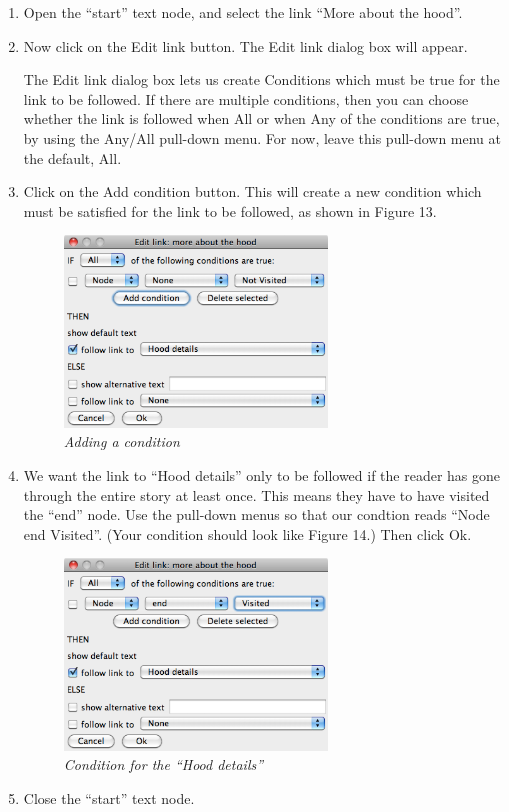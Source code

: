 \documentclass{article}
\begin{document}
\begin{enumerate}
  \item Open the ``start'' text node, and select the link ``More about the hood''.
  \item Now click on the Edit link button. The Edit link dialog box will
  appear.

The Edit link dialog box lets us create Conditions which must be true for the
link to be followed. If there are multiple conditions, then you can choose
whether the link is followed when All or when Any of the conditions are true,
by using the Any/All pull-down menu. For now, leave this pull-down menu at the
default, All.

\item Click on the Add condition button. This will create a new condition which
must be satisfied for the link to be followed, as shown in Figure 13.
 
\begin{figure}[ht]
  \centering
  \includegraphics[width=7cm]{images/hypedyn-tutorial-1-figure-13}
  \caption{\textit{Adding a condition}}
\end{figure} 

\item We want the link to ``Hood details'' only to be followed if the reader has
gone through the entire story at least once. This means they have to have
visited the ``end'' node. Use the pull-down menus so that our condtion reads
``Node end Visited''. (Your condition should look like Figure 14.) Then
click Ok.

\begin{figure}[ht]
  \centering
  \includegraphics[width=7cm]{images/hypedyn-tutorial-1-figure-14}
  \caption{\textit{Condition for the ``Hood details''}}
\end{figure} 

\item Close the ``start'' text node.
\end{enumerate}
\end{document}
